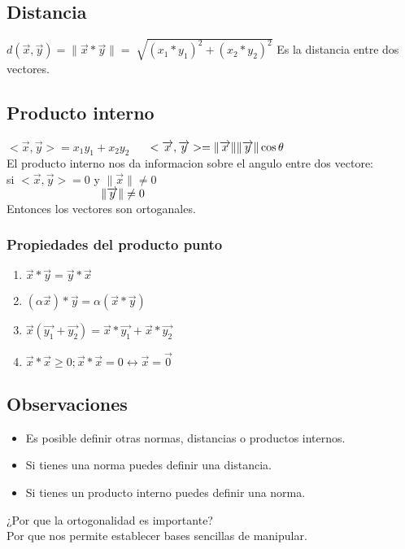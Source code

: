 \documentclass{book}
\begin{document}
\subsection*{Distancia}
$d(\overrightarrow{x},\overrightarrow{y})=\|\overrightarrow{x}*\overrightarrow{y}\|=\sqrt[]{(x_{1}*y_{1})^2+(x_{2}*y_{2})^2}$ Es la distancia entre dos vectores.
\subsection*{Producto interno}
$<\overrightarrow{x},\overrightarrow{y}>=x_{1}y_{1}+x_{2}y_{2}$
$\\\hspace*{0.4cm}<\overrightarrow{x},\overrightarrow{y}>=\|\overrightarrow{x}\|\|\overrightarrow{y}\|\cos \theta$
\\El producto interno nos da informacion sobre el angulo entre dos vectore:
\\si $<\overrightarrow{x},\overrightarrow{y}>=0$ y $\|\overrightarrow{x}\|\neq0$
\\$\hspace*{2.9cm}\|\overrightarrow{y}\|\neq0$
\\Entonces los vectores son ortoganales.
\subsubsection*{Propiedades del producto punto}
\begin{enumerate}
    \item $\overrightarrow{x}*\overrightarrow{y}=\overrightarrow{y}*\overrightarrow{x}$
    \item $(\alpha\overrightarrow{x})*\overrightarrow{y}=\alpha(\overrightarrow{x}*\overrightarrow{y})$
    \item $\overrightarrow{x}(\overrightarrow{y_{1}}+\overrightarrow{y_{2}})=\overrightarrow{x}*\overrightarrow{y_{1}}+\overrightarrow{x}*\overrightarrow{y_{2}}$
    \item $\overrightarrow{x}*\overrightarrow{x}\geq0;$$\overrightarrow{x}*\overrightarrow{x}=0\longleftrightarrow\overrightarrow{x}=\overrightarrow{0}$
\end{enumerate}
\subsection*{Observaciones}
\begin{itemize}
    \item Es posible definir otras normas, distancias o productos internos.
    \item Si tienes una norma puedes definir una distancia.
    \item Si tienes un producto interno puedes definir una norma.
    
\end{itemize}
¿Por que la ortogonalidad es importante?
\\Por que nos permite establecer bases sencillas de manipular.
\end{document}
